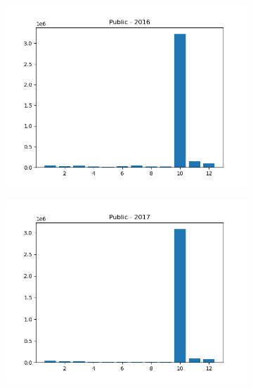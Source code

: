 \documentclass{article}
\begin{document}
\begin{figure}[H]
\begin{subfigure}{.5\textwidth}
        \includegraphics[width=\textwidth]{../../output/figures/annual_source_distribution/Public_data_dist_2016.png}
    \end{subfigure}
    \begin{subfigure}{.5\textwidth}
        \centering
        \includegraphics[width=\textwidth]{../../output/figures/annual_source_distribution/Public_data_dist_2017.png}
    \end{subfigure}
\end{figure}

\newpage 
\end{document}
